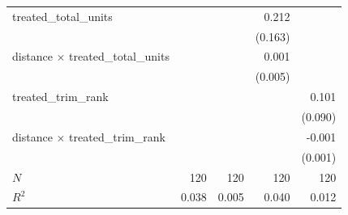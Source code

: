 \begin{tabular}{lrrrr}
treated\_total\_units                   &                                           &                                          &                                     0.212 &                                         \\ 
                                        &                                           &                                          &                                   (0.163) &                                         \\ 
distance $\times$ treated\_total\_units &                                           &                                          &                                     0.001 &                                         \\ 
                                        &                                           &                                          &                                   (0.005) &                                         \\ 
treated\_trim\_rank                     &                                           &                                          &                                           &                                   0.101 \\ 
                                        &                                           &                                          &                                           &                                 (0.090) \\ 
distance $\times$ treated\_trim\_rank   &                                           &                                          &                                           &                                  -0.001 \\ 
                                        &                                           &                                          &                                           &                                 (0.001) \\ 
\midrule
$N$                                     &                                       120 &                                      120 &                                       120 &                                     120 \\ 
$R^2$                                   &                                     0.038 &                                    0.005 &                                     0.040 &                                   0.012 \\ 
\bottomrule
\end{tabular}
